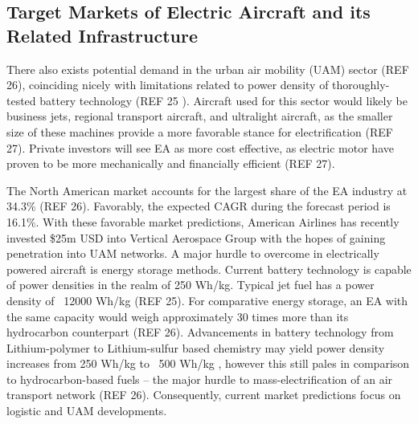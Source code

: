 \documentclass{article}
\begin{document}
\subsection{Target Markets of Electric Aircraft and its Related Infrastructure}
There also exists potential demand in the urban air mobility (UAM) sector (REF 26), coinciding nicely with limitations related to power density of thoroughly-tested battery technology (REF 25 ). Aircraft used for this sector would likely be business jets, regional transport aircraft, and ultralight aircraft, as the smaller size of these machines provide a more favorable stance for electrification (REF 27). Private investors will see EA as more cost effective, as electric motor have proven to be more mechanically and financially efficient (REF 27).\par
The North American market accounts for the largest share of the EA industry at 34.3\% (REF 26). Favorably, the expected CAGR during the forecast period is 16.1\%. With these favorable market predictions, American Airlines has recently invested \$25m USD into Vertical Aerospace Group with the hopes of gaining penetration into UAM networks.  A major hurdle to overcome in electrically powered aircraft is energy storage methods. Current battery technology is capable of power densities in the realm of 250  Wh/kg. Typical jet fuel has a power density of ~12000 Wh/kg (REF 25). For comparative energy storage, an EA with the same capacity would weigh approximately 30 times more than its hydrocarbon counterpart (REF 26).  Advancements in battery technology from Lithium-polymer to Lithium-sulfur based chemistry may yield power density increases from 250 Wh/kg to ~500 Wh/kg , however this still pales in comparison to hydrocarbon-based fuels – the major hurdle to mass-electrification of an air transport network (REF 26). Consequently, current market predictions focus on logistic and UAM developments.\par
\end{document}
